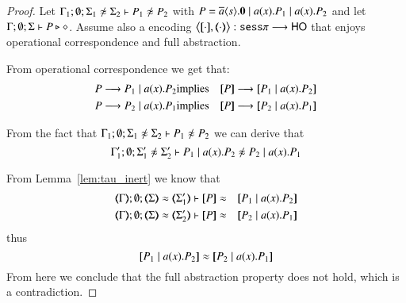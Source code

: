 \begin{proof}
	Let $\Gamma_1; \emptyset; \Sigma_1 \not\wb \Sigma_2 \proves P_1 \not\wb P_2 $
	with $P = \overline{a} \langle s \rangle . \mathbf{0} \;|\; a (x) . P_1 \;|\; a (x) . P_2$ and
	let $\Gamma; \emptyset; \Sigma \vdash P \triangleright \diamond$.
	Assume also a encoding
	$\enc{\cdot}{\cdot}: \sesp \longrightarrow \HO$
	that enjoys
	operational correspondence and full abstraction.

	From operational correspondence we get that:
	\begin{eqnarray*}
		P \red P_1 \Par \bacc{a}{x} P_2 &\textrm{implies}& \map{P} \red \map{P_1 \Par \bacc{a}{x} P_2}\\
		P \red P_2 \Par \bacc{a}{x} P_1 &\textrm{implies}& \map{P} \red \map{P_2 \Par \bacc{a}{x} P_1}
	\end{eqnarray*}

	From the fact that
	$\Gamma_1; \emptyset; \Sigma_1 \not\wb \Sigma_2 \proves P_1 \not\wb P_2$
	we can derive that
	\[
		\Gamma_1'; \emptyset; \Sigma_1' \not\wb \Sigma_2' \proves P_1 \Par \bacc{a}{x} P_2 \not\wb P_2 \Par \bacc{a}{x} P_1
	\]

	From Lemma~\ref{lem:tau_inert} we know that
	\begin{eqnarray*}
		\mapt{\Gamma}; \emptyset; \mapt{\Sigma} \wb \mapt{\Sigma_1'} \proves \map{P} &\wb& \map{P_1 \Par \bacc{a}{x} P_2}\\
		\mapt{\Gamma}; \emptyset; \mapt{\Sigma} \wb \mapt{\Sigma_2'} \proves \map{P} &\wb& \map{P_2 \Par \bacc{a}{x} P_1}
	\end{eqnarray*}
	\noi thus
	\[
		\map{P_1 \Par \bacc{a}{x} P_2} \wb \map{P_2 \Par \bacc{a}{x} P_1}
	\]
	From here we conclude that the full abstraction property does not hold,
	which is a contradiction.
\end{proof}
